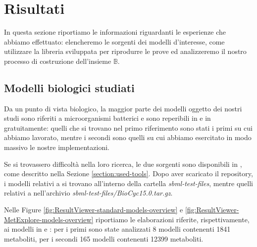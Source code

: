 \section{Risultati}
In questa sezione riportiamo le informazioni riguardanti le esperienze
che abbiamo effettuato: elencheremo le sorgenti dei modelli
d'interesse, come utilizzare la libreria sviluppata per riprodurre le
prove ed analizzeremo il nostro processo di costruzione dell'insieme
$\mathbb{B}$.

\subsection{Modelli biologici studiati}
Da un punto di vista biologico, la maggior parte dei modelli oggetto
dei nostri studi sono riferiti a microorganismi batterici e sono
reperibili in \cite{SymBioCyc} e in \cite{MetExplore} gratuitamente:
quelli che si trovano nel primo riferimento sono stati i primi su cui
abbiamo lavorato, mentre i secondi sono quelli su cui abbiamo
esercitato in modo massivo le nostre implementazioni.

Se si trovassero difficolt\`a nella loro ricerca, le due sorgenti sono
disponibili in \cite{MyJavaImpl}, come descritto nella Sezione
\ref{section:used-tools}. Dopo aver scaricato il repository, i modelli
relativi a \cite{SymBioCyc} si trovano all'interno della cartella
\emph{sbml-test-files}, mentre quelli relativi a \cite{MetExplore}
nell'archivio \emph{sbml-test-files/BioCyc15.0.tar.gz}.

Nelle Figure \ref{fig:ResultViewer-standard-models-overview} e
\ref{fig:ResultViewer-MetExplore-models-overview} riportiamo le
elaborazioni riferite, rispettivamente, ai modelli in \cite{SymBioCyc}
e \cite{MetExplore}: per i primi sono state analizzati 8 modelli
contenenti 1841 metaboliti, per i secondi 165 modelli contenenti 12399
metaboliti.

